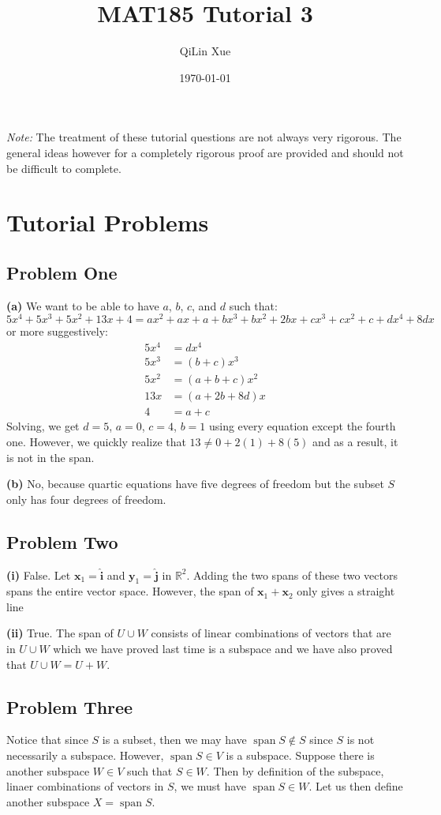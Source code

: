 \documentclass{article}
\title{MAT185 Tutorial 3}
\author{QiLin Xue}
\date{\today}
\DeclareMathOperator{\spn}{span}
\begin{document}
\maketitle
\textit{Note:} The treatment of these tutorial questions are not always very rigorous. The general ideas however for a completely rigorous proof are provided and should not be difficult to complete.
\section{Tutorial Problems}
\subsection*{Problem One}
\textbf{(a)} We want to be able to have $a$, $b$, $c$, and $d$ such that:
\begin{equation}
    5x^4+5x^3+5x^2+13x+4 = ax^2+ax+a+bx^3+bx^2+2bx + cx^3+cx^2+c+dx^4+8dx
\end{equation}
or more suggestively:
\begin{align}
    5x^4 &= dx^4 \\ 
    5x^3 &= (b+c)x^3 \\ 
    5x^2 &= (a+b+c)x^2 \\ 
    13x  &= (a+2b+8d)x \\ 
    4 &= a+c
\end{align}
Solving, we get $d=5$, $a=0$, $c=4$, $b=1$ using every equation except the fourth one. However, we quickly realize that $13 \neq 0 + 2(1) + 8(5)$ and as a result, it is not in the span.
\vspace{2mm}

\textbf{(b)} No, because quartic equations have five degrees of freedom but the subset $S$ only has four degrees of freedom.
\subsection*{Problem Two}
\textbf{(i)} False. Let $\bm{x}_1=\bm{\hat{i}}$ and $\bm{y}_1=\bm{\hat{j}}$ in $\mathbb{R}^2$. Adding the two spans of these two vectors spans the entire vector space. However, the span of $\bm{x}_1+\bm{x}_2$ only gives a straight line 
\vspace{2mm}

\textbf{(ii)} True. The span of $U \cup W$ consists of linear combinations of vectors that are in $U \cup W$ which we have proved last time is a subspace and we have also proved that $U \cup W = U +W$.
\subsection*{Problem Three}
Notice that since $S$ is a subset, then we may have $\spn S \notin S$ since $S$ is not necessarily a subspace. However, $\spn S \in V$ is a subspace. Suppose there is another subspace $W \in V$ such that $S \in W$. Then by definition of the subspace, linaer combinations of vectors in $S$, we must have $\spn S \in W$. Let us then define another subspace $X = \spn S$.
\vspace{2mm}
\end{document}
